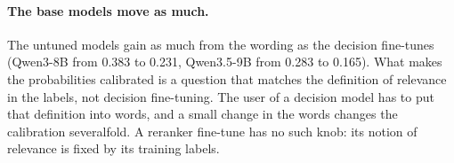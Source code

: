 \paragraph{The base models move as much.}
The untuned models gain as much from the wording as the decision fine-tunes (Qwen3-8B from 0.383 to 0.231,
Qwen3.5-9B from 0.283 to 0.165). What makes the probabilities calibrated is a question that matches the definition of
relevance in the labels, not decision fine-tuning. The user of a decision model has to put that definition into words,
and a small change in the words changes the calibration severalfold. A reranker fine-tune has no such knob: its notion
of relevance is fixed by its training labels.
